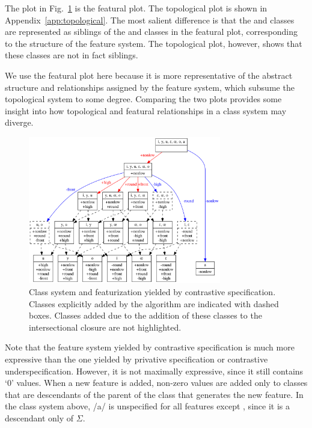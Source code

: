 \documentclass[11pt, oneside]{article}   	%
\begin{document}
The plot in Fig.~\ref{fig:contrastive} is the featural plot. The topological plot is shown in Appendix~\ref{app:topological}. The most salient difference is that the  and  classes are represented as siblings of the  and  classes in the featural plot, corresponding to the structure of the feature system. The topological plot, however, shows that these classes are not in fact siblings.

We use the featural plot here because it is more representative of the abstract structure and relationships assigned by the feature system, which subsume the topological system to some degree. Comparing the two plots provides some insight into how topological and featural relationships in a class system may diverge. 

\begin{figure}[htb!]
	\centering
	\includegraphics[width=0.75\textwidth]{vowel_inventory_contrastive_FEATURAL.png}
	\caption{Class system and featurization yielded by contrastive specification. Classes explicitly added by the algorithm are indicated with dashed boxes. Classes added due to the addition of these classes to the intersectional closure are not highlighted.}
	\label{fig:contrastive}
\end{figure}

Note that the feature system yielded by contrastive specification is much more expressive than the one yielded by privative specification or contrastive underspecification. However, it is not maximally expressive, since it still contains `$0$' values. When a new feature is added, non-zero values are added only to classes that are descendants of the parent of the class that generates the new feature. In the class system above, /a/ is unspecified for all features except , since it is a descendant only of $\Sigma$.
\end{document}
